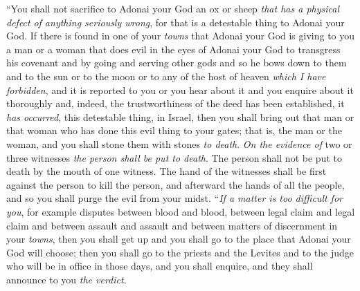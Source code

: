 \begin{biblechapter} %
\verse “You shall not sacrifice to Adonai your God an ox or sheep \textit{that has a physical defect} \textit{of anything seriously wrong}, for that is a detestable thing to Adonai your God.
\verse If there is found in one of your \textit{towns} that Adonai your God is giving to you a man or a woman that does evil in the eyes of Adonai your God to transgress his covenant
\verse and by going and serving other gods and so he bows down to them and to the sun or to the moon or to any of the host of heaven \textit{which I have forbidden},
\verse and it is reported to you or you hear about it and you enquire about it thoroughly and, indeed, the trustworthiness of the deed has been established, it \textit{has occurred}, this detestable thing, in Israel,
\verse then you shall bring out that man or that woman who has done this evil thing to your gates; that is, the man or the woman, and you shall stone them with stones \textit{to death}.
\verse \textit{On the evidence of} two or three witnesses \textit{the person shall be put to death}. The person shall not be put to death by the mouth of one witness.
\verse The hand of the witnesses shall be first against the person to kill the person, and afterward the hands of all the people, and so you shall purge the evil from your midst.
\verse “\textit{If a matter is too difficult for you}, for example disputes between blood and blood, between legal claim and legal claim and between assault and assault and between matters of discernment in your \textit{towns}, then you shall get up and you shall go to the place that Adonai your God will choose;
\verse then you shall go to the priests and the Levites and to the judge who will be in office in those days, and you shall enquire, and they shall announce to you \textit{the verdict}.

\end{biblechapter}

